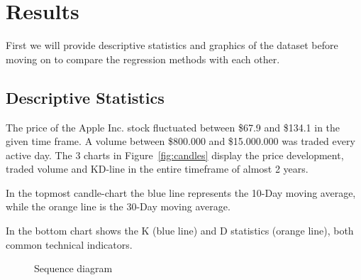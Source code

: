 \documentclass[utf8x]{ctexart}
\begin{document}
\section{Results}

First we will provide descriptive statistics and graphics of the dataset before moving on to compare the regression methods with each other.

\subsection{Descriptive Statistics}

The price of the Apple Inc. stock fluctuated between \$67.9 and \$134.1 in the given time frame. A volume between \$800.000 and \$15.000.000 was traded every active day.
The 3 charts in Figure~\ref{fig:candles} display the price development, traded volume and KD-line in the entire timeframe of almost 2 years.

In the topmost candle-chart the blue line represents the 10-Day moving average, while the orange line is the 30-Day moving average.

In the bottom chart shows the K (blue line) and D statistics (orange line), both common technical indicators.

\label{fig:candles}
\begin{figure}[p]
    \vspace*{-2cm}
    \caption{Sequence diagram}
\end{figure}
\end{document}
